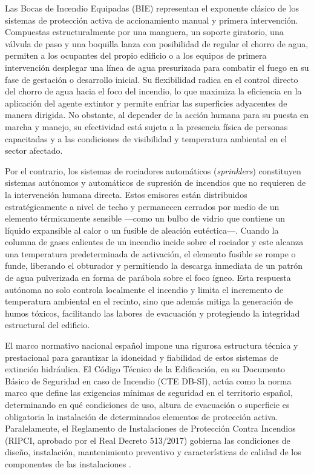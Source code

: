 \documentclass[12pt,a4paper]{article}
\begin{document}
Las Bocas de Incendio Equipadas (BIE) representan el exponente clásico de los sistemas de protección activa de accionamiento manual y primera intervención. Compuestas estructuralmente por una manguera, un soporte giratorio, una válvula de paso y una boquilla lanza con posibilidad de regular el chorro de agua, permiten a los ocupantes del propio edificio o a los equipos de primera intervención desplegar una línea de agua presurizada para combatir el fuego en su fase de gestación o desarrollo inicial. Su flexibilidad radica en el control directo del chorro de agua hacia el foco del incendio, lo que maximiza la eficiencia en la aplicación del agente extintor y permite enfriar las superficies adyacentes de manera dirigida. No obstante, al depender de la acción humana para su puesta en marcha y manejo, su efectividad está sujeta a la presencia física de personas capacitadas y a las condiciones de visibilidad y temperatura ambiental en el sector afectado.

Por el contrario, los sistemas de rociadores automáticos (\textit{sprinklers}) constituyen sistemas autónomos y automáticos de supresión de incendios que no requieren de la intervención humana directa. Estos emisores están distribuidos estratégicamente a nivel de techo y permanecen cerrados por medio de un elemento térmicamente sensible ---como un bulbo de vidrio que contiene un líquido expansible al calor o un fusible de aleación eutéctica---. Cuando la columna de gases calientes de un incendio incide sobre el rociador y este alcanza una temperatura predeterminada de activación, el elemento fusible se rompe o funde, liberando el obturador y permitiendo la descarga inmediata de un patrón de agua pulverizada en forma de parábola sobre el foco ígneo. Esta respuesta autónoma no solo controla localmente el incendio y limita el incremento de temperatura ambiental en el recinto, sino que además mitiga la generación de humos tóxicos, facilitando las labores de evacuación y protegiendo la integridad estructural del edificio.

El marco normativo nacional español impone una rigurosa estructura técnica y prestacional para garantizar la idoneidad y fiabilidad de estos sistemas de extinción hidráulica. El Código Técnico de la Edificación, en su Documento Básico de Seguridad en caso de Incendio (CTE DB-SI), actúa como la norma marco que define las exigencias mínimas de seguridad en el territorio español, determinando en qué condiciones de uso, altura de evacuación o superficie es obligatoria la instalación de determinados elementos de protección activa. Paralelamente, el Reglamento de Instalaciones de Protección Contra Incendios (RIPCI, aprobado por el Real Decreto 513/2017) gobierna las condiciones de diseño, instalación, mantenimiento preventivo y características de calidad de los componentes de las instalaciones \parencite{CTE_DBSI,RIPCI_2017,RIPCI_GUIA_2022}. 
\end{document}
